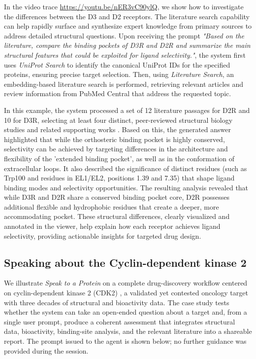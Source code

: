 \documentclass[journal=jcisd8,manuscript=article]{achemso}
\begin{document}
In the video trace \url{https://youtu.be/nER3vC90ylQ}, we show how to investigate the differences between the D3 and D2 receptors. The literature search capability can help rapidly surface and synthesize expert knowledge from primary sources to address detailed structural questions.
Upon receiving the prompt \emph{"Based on the literature, compare the binding pockets of D3R and D2R and summarize the main structural features that could be exploited for ligand selectivity."}, the system first uses \emph{UniProt Search} to identify the canonical UniProt IDs for the specified proteins, ensuring precise target selection. Then, using \emph{Literature Search}, an embedding-based literature search is performed, retrieving relevant articles and review information from PubMed Central that address the requested topic.

In this example, the system processed a set of 12 literature passages for D2R and 10 for D3R, selecting at least four distinct, peer-reviewed structural biology studies and related supporting works \citep{Wang2018,Chien2010,Yin2020,Fan2020}. Based on this, the generated answer highlighted that while the orthosteric binding pocket is highly conserved, selectivity can be achieved by targeting differences in the architecture and flexibility of the 'extended binding pocket', as well as in the conformation of extracellular loops. It also described the significance of distinct residues (such as Trp100 and residues in EL1/EL2, positions 1.39 and 7.35) that shape ligand binding modes and selectivity opportunities.
The resulting analysis revealed that while D3R and D2R share a conserved binding pocket core, D2R possesses additional flexible and hydrophobic residues that create a deeper, more accommodating pocket. These structural differences, clearly visualized and annotated in the viewer, help explain how each receptor achieves ligand selectivity, providing actionable insights for targeted drug design.



\subsection{Speaking about the Cyclin-dependent kinase 2}\label{subsec:cdk2}

We illustrate \emph{Speak to a Protein} on a complete drug-discovery workflow centered on cyclin-dependent kinase 2 (CDK2) \citep{Malumbres2009}, a validated yet contested oncology target with three decades of structural and bioactivity data. The case study tests whether the system can take an open-ended question about a target and, from a single user prompt, produce a coherent assessment that integrates structural data, bioactivity, binding-site analysis, and the relevant literature into a shareable report. The prompt issued to the agent is shown below; no further guidance was provided during the session.
\end{document}
